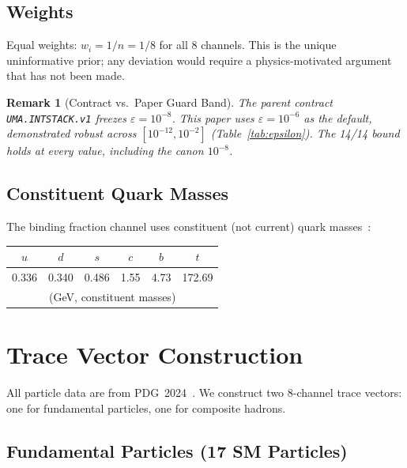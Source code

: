 \documentclass[
  aps,
  prd,
  twocolumn,
  superscriptaddress,
  nofootinbib,
  floatfix
]{revtex4-2}
\newtheorem{remark}{Remark}
\newcommand{\eps}{\varepsilon}
\begin{document}
\subsection{Weights}

Equal weights: $w_i = 1/n = 1/8$ for all 8 channels.
This is the unique uninformative prior; any deviation would
require a physics-motivated argument that has not been made.

\begin{remark}[Contract vs.\ Paper Guard Band]\label{rem:epsilon}
The parent contract \texttt{UMA.INTSTACK.v1} freezes
$\eps = 10^{-8}$.  This paper uses $\eps = 10^{-6}$ as the
default, demonstrated robust across $[10^{-12}, 10^{-2}]$
(Table~\ref{tab:epsilon}).  The 14/14 bound holds at
\emph{every} value, including the canon $10^{-8}$.
\end{remark}

\subsection{Constituent Quark Masses}

The binding fraction channel uses constituent (not current)
quark masses~\cite{pdg2024}:
\begin{center}\small
\begin{tabular}{cccccc}
$u$ & $d$ & $s$ & $c$ & $b$ & $t$ \\
\midrule
0.336 & 0.340 & 0.486 & 1.55 & 4.73 & 172.69 \\[2pt]
\multicolumn{6}{c}{(GeV, constituent masses)}
\end{tabular}
\end{center}


\section{Trace Vector Construction}\label{sec:trace}

All particle data are from PDG~2024~\cite{pdg2024}.  We construct
two 8-channel trace vectors: one for fundamental particles, one
for composite hadrons.

\subsection{Fundamental Particles (17 SM Particles)}
\end{document}
